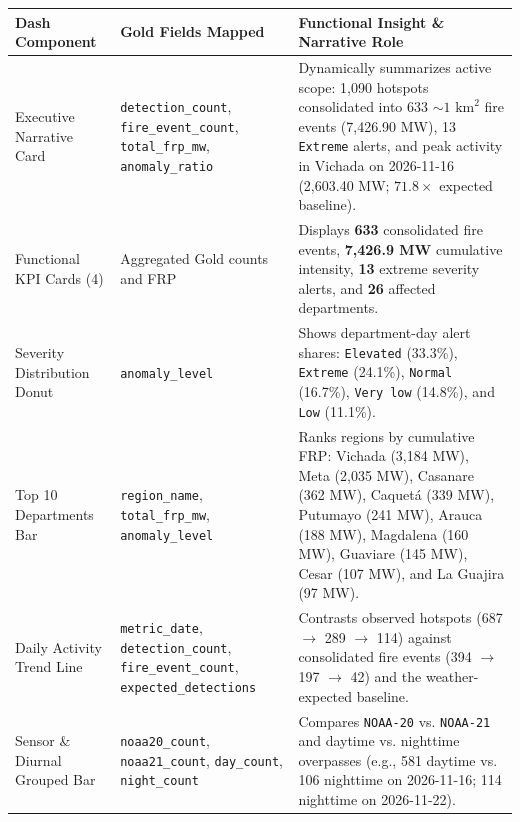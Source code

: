 \documentclass[11pt,a4paper]{article}
\begin{document}
\begin{table}[htbp]
\centering
\footnotesize
\begin{tabularx}{\textwidth}{>{\RaggedRight\arraybackslash}p{3.1cm} >{\RaggedRight\arraybackslash}p{3.5cm} >{\RaggedRight\arraybackslash}X}
\toprule
\textbf{Dash Component} & \textbf{Gold Fields Mapped} & \textbf{Functional Insight \& Narrative Role} \\
\midrule
Executive Narrative Card & \texttt{detection\_\allowbreak count}, \texttt{fire\_\allowbreak event\_\allowbreak count}, \texttt{total\_\allowbreak frp\_\allowbreak mw}, \texttt{anomaly\_\allowbreak ratio} & Dynamically summarizes active scope: 1,090 hotspots consolidated into 633 $\sim 1\text{ km}^2$ fire events (7,426.90 MW), 13 \texttt{Extreme} alerts, and peak activity in Vichada on 2026-11-16 (2,603.40 MW; $71.8\times$ expected baseline). \\
\addlinespace[3pt]
Functional KPI Cards (4) & Aggregated Gold counts and FRP & Displays \textbf{633} consolidated fire events, \textbf{7,426.9 MW} cumulative intensity, \textbf{13} extreme severity alerts, and \textbf{26} affected departments. \\
\addlinespace[3pt]
Severity Distribution Donut & \texttt{anomaly\_\allowbreak level} & Shows department-day alert shares: \texttt{Elevated} (33.3\%), \texttt{Extreme} (24.1\%), \texttt{Normal} (16.7\%), \texttt{Very low} (14.8\%), and \texttt{Low} (11.1\%). \\
\addlinespace[3pt]
Top 10 Departments Bar & \texttt{region\_\allowbreak name}, \texttt{total\_\allowbreak frp\_\allowbreak mw}, \texttt{anomaly\_\allowbreak level} & Ranks regions by cumulative FRP: Vichada (3,184 MW), Meta (2,035 MW), Casanare (362 MW), Caquet\'a (339 MW), Putumayo (241 MW), Arauca (188 MW), Magdalena (160 MW), Guaviare (145 MW), Cesar (107 MW), and La Guajira (97 MW). \\
\addlinespace[3pt]
Daily Activity Trend Line & \texttt{metric\_\allowbreak date}, \texttt{detection\_\allowbreak count}, \texttt{fire\_\allowbreak event\_\allowbreak count}, \texttt{expected\_\allowbreak detections} & Contrasts observed hotspots (687 $\rightarrow$ 289 $\rightarrow$ 114) against consolidated fire events (394 $\rightarrow$ 197 $\rightarrow$ 42) and the weather-expected baseline. \\
\addlinespace[3pt]
Sensor \& Diurnal Grouped Bar & \texttt{noaa20\_\allowbreak count}, \texttt{noaa21\_\allowbreak count}, \texttt{day\_\allowbreak count}, \texttt{night\_\allowbreak count} & Compares \texttt{NOAA-20} vs. \texttt{NOAA-21} and daytime vs. nighttime overpasses (e.g., 581 daytime vs. 106 nighttime on 2026-11-16; 114 nighttime on 2026-11-22). \\

\end{tabularx}
\end{table}
\end{document}
